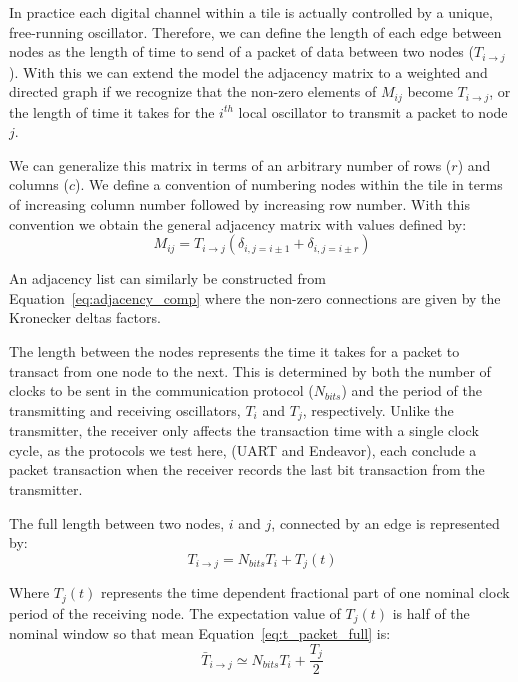 In practice each digital channel within a tile is actually controlled by a unique, free-running oscillator.
Therefore, we can define the length of each edge between nodes as the length of time to send of a packet of data between two nodes ($T_{i\rightarrow j}$).
With this we can extend the model the adjacency matrix to a weighted and directed graph if we recognize that the non-zero elements of $M_{ij}$ become $T_{i\rightarrow j}$, or the length of time it takes for the $i^{th}$ local oscillator to transmit a packet to node $j$.

We can generalize this matrix in terms of an arbitrary number of rows ($r$) and columns ($c$).
We define a convention of numbering nodes within the tile in terms of increasing column number followed by increasing row number.
With this convention we obtain the general adjacency matrix with values defined by:
\begin{equation}~\label{eq:adjacency_comp}
  M_{ij} = T_{i\rightarrow j}(\delta_{i,j=i\pm 1} + \delta_{i,j=i\pm r})
\end{equation}

An adjacency list can similarly be constructed from Equation~\ref{eq:adjacency_comp} where the non-zero connections are given by the Kronecker deltas factors.

The length between the nodes represents the time it takes for a packet to transact from one node to the next.
This is determined by both the number of clocks to be sent in the communication protocol ($N_{bits}$) and the period of the transmitting and receiving oscillators, $T_{i}$ and $T_{j}$, respectively.
Unlike the transmitter, the receiver only affects the transaction time with a single clock cycle, as the protocols we test here, (UART and Endeavor), each conclude a packet transaction when the receiver records the last bit transaction from the transmitter.

The full length between two nodes, $i$ and $j$, connected by an edge is represented by:
\begin{equation}~\label{eq:t_packet_full}
T_{i\rightarrow j} = N_{bits}T_{i} + T_{j}(t)
\end{equation}

Where $T_{j}(t)$ represents the time dependent fractional part of one nominal clock period of the receiving node.
The expectation value of $T_{j}(t)$ is half of the nominal window so that mean Equation~\ref{eq:t_packet_full} is:
\begin{equation}~\label{eq:t_packet_avg}
\bar{T}_{i\rightarrow j} \simeq N_{bits}T_{i} + \frac{T_{j}}{2}
\end{equation}

